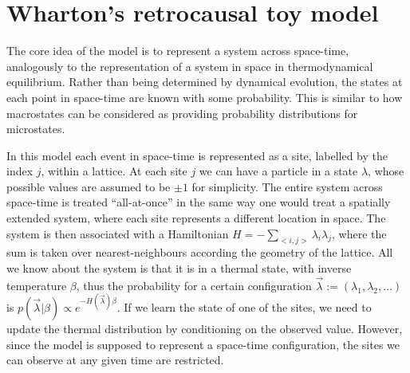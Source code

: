 \documentclass[a4paper,onecolumn,11pt,accepted=2018-05-04]{quantumarticle}
\begin{document}
\appendix

\section{Wharton's retrocausal toy model}
\label{toywharton}

The core idea of the model is to represent a system across space-time, analogously to the representation of a system in space in thermodynamical equilibrium. Rather than being determined by dynamical evolution, the states at each point in space-time are known with some probability. This is similar to how macrostates can be considered as providing probability distributions for microstates. 

In this model each event in space-time is represented as a site, labelled by the index $j$, within a lattice. At each site $j$  we can have a particle in a state $\lambda$, whose possible values are assumed to be $\pm 1$ for simplicity. The entire system across space-time is treated ``all-at-once'' in the same way one would treat a spatially extended system, where each site represents a different location in space. The system is then associated with a Hamiltonian $H=-\sum_{<i,j>} \lambda_i \lambda_j$, where the sum is taken over nearest-neighbours according the geometry of the lattice. All we know about the system is that it is in a thermal state, with inverse temperature $\beta$, thus the probability for a certain configuration $\vec{\lambda}:=\left(\lambda_1,\lambda_2,\dots\right)$ is $p(\vec{\lambda}|\beta) \propto e^{- H(\vec{\lambda})\beta}$. If we learn the state of one of the sites, we need to update the thermal distribution by conditioning on the observed value. However, since the model is supposed to represent a space-time configuration, the sites we can observe at any given time are restricted. 
\end{document}
